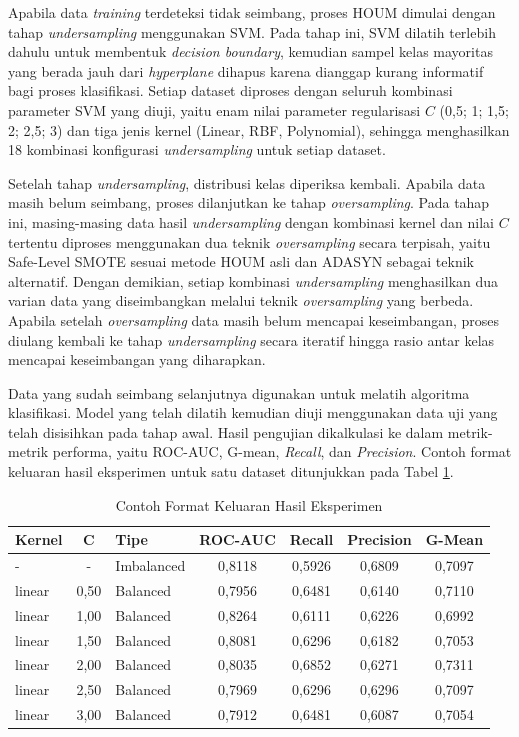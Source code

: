 Apabila data \textit{training} terdeteksi tidak seimbang, proses HOUM dimulai dengan tahap \textit{undersampling} menggunakan SVM. Pada tahap ini, SVM dilatih terlebih dahulu untuk membentuk \textit{decision boundary}, kemudian sampel kelas mayoritas yang berada jauh dari \textit{hyperplane} dihapus karena dianggap kurang informatif bagi proses klasifikasi. Setiap dataset diproses dengan seluruh kombinasi parameter SVM yang diuji, yaitu enam nilai parameter regularisasi $C$ (0,5; 1; 1,5; 2; 2,5; 3) dan tiga jenis kernel (Linear, RBF, Polynomial), sehingga menghasilkan 18 kombinasi konfigurasi \textit{undersampling} untuk setiap dataset.

Setelah tahap \textit{undersampling}, distribusi kelas diperiksa kembali. Apabila data masih belum seimbang, proses dilanjutkan ke tahap \textit{oversampling}. Pada tahap ini, masing-masing data hasil \textit{undersampling} dengan kombinasi kernel dan nilai $C$ tertentu diproses menggunakan dua teknik \textit{oversampling} secara terpisah, yaitu Safe-Level SMOTE sesuai metode HOUM asli dan ADASYN sebagai teknik alternatif. Dengan demikian, setiap kombinasi \textit{undersampling} menghasilkan dua varian data yang diseimbangkan melalui teknik \textit{oversampling} yang berbeda. Apabila setelah \textit{oversampling} data masih belum mencapai keseimbangan, proses diulang kembali ke tahap \textit{undersampling} secara iteratif hingga rasio antar kelas mencapai keseimbangan yang diharapkan.

Data yang sudah seimbang selanjutnya digunakan untuk melatih algoritma klasifikasi. Model yang telah dilatih kemudian diuji menggunakan data uji yang telah disisihkan pada tahap awal. Hasil pengujian dikalkulasi ke dalam metrik-metrik performa, yaitu ROC-AUC, G-mean, \textit{Recall}, dan \textit{Precision}. Contoh format keluaran hasil eksperimen untuk satu dataset ditunjukkan pada Tabel \ref{table:3.contohoutput}.

\begin{table}[H]
\centering
\caption{Contoh Format Keluaran Hasil Eksperimen}
\label{table:3.contohoutput}
\footnotesize
\begin{tabular}{|l|c|l|c|c|c|c|}
\hline
\textbf{Kernel} & \textbf{C} & \textbf{Tipe} & \textbf{ROC-AUC} & \textbf{Recall} & \textbf{Precision} & \textbf{G-Mean} \\
\hline
- & - & Imbalanced & 0,8118 & 0,5926 & 0,6809 & 0,7097 \\
\hline
linear & 0,50 & Balanced & 0,7956 & 0,6481 & 0,6140 & 0,7110 \\
\hline
linear & 1,00 & Balanced & 0,8264 & 0,6111 & 0,6226 & 0,6992 \\
\hline
linear & 1,50 & Balanced & 0,8081 & 0,6296 & 0,6182 & 0,7053 \\
\hline
linear & 2,00 & Balanced & 0,8035 & 0,6852 & 0,6271 & 0,7311 \\
\hline
linear & 2,50 & Balanced & 0,7969 & 0,6296 & 0,6296 & 0,7097 \\
\hline
linear & 3,00 & Balanced & 0,7912 & 0,6481 & 0,6087 & 0,7054 \\
\hline
\end{tabular}
\end{table}

